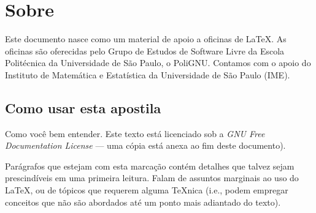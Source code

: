 \section*{Sobre}

Este documento nasce como um material de apoio a oficinas de
\LaTeX. As oficinas são oferecidas pelo Grupo de Estudos de Software
Livre da Escola Politécnica da Universidade de São Paulo, o PoliGNU.
Contamos com o apoio do Instituto de Matemática e Estatística da
Universidade de São Paulo (IME).

\subsection*{Como usar esta apostila}

Como você bem entender. Este texto está licenciado sob a \emph{GNU Free
Documentation License} --- uma cópia está anexa ao fim deste documento).

\begin{detalhe}
Parágrafos que estejam com esta marcação contém detalhes que talvez
sejam prescindíveis em uma primeira leitura. Falam de assuntos
marginais ao uso do \LaTeX, ou de tópicos que requerem alguma
\TeX nica (i.e., podem empregar conceitos que não são abordados até
um ponto mais adiantado do texto).
\end{detalhe}




